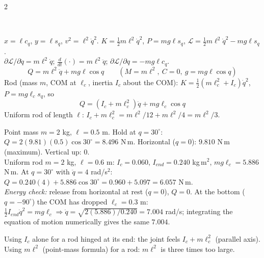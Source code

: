 \begin{multicols}{2}
\begin{center}
\\
\end{center}
\begin{deriv}
$x=\ell c_q$, $y=\ell s_q$, $v^2=\ell^2\dot q^2$. $K=\tfrac12m\ell^2\dot q^2$, $P=mg\ell s_q$, $\mathcal L=\tfrac12m\ell^2\dot q^2-mg\ell s_q$.\\
$\partial\mathcal L/\partial\dot q=m\ell^2\dot q$; $\frac d{dt}(\cdot)=m\ell^2\ddot q$; $\partial\mathcal L/\partial q=-mg\ell c_q$.
\[Q=m\ell^2\ddot q+mg\ell\cos q\qquad(M=m\ell^2,\ C=0,\ g=mg\ell\cos q)\]
Rod (mass $m$, COM at $\ell_c$, inertia $I_c$ about the COM): $K=\tfrac12(m\ell_c^2+I_c)\dot q^2$, $P=mg\ell_cs_q$, so
\[Q=(I_c+m\ell_c^2)\ddot q+mg\ell_c\cos q\]
Uniform rod of length $\ell$: $I_c+m\ell_c^2=m\ell^2/12+m\ell^2/4=m\ell^2/3$.
\end{deriv}
\begin{worked}
Point mass $m=2$ kg, $\ell=0.5$ m. Hold at $q=30^\circ$: $Q=2(9.81)(0.5)\cos30^\circ=8.496$ N\,m. Horizontal ($q=0$): $9.810$ N\,m (maximum). Vertical up: $0$.\\
Uniform rod $m=2$ kg, $\ell=0.6$ m: $I_c=0.060$, $I_{end}=0.240$ kg\,m$^2$, $mg\ell_c=5.886$ N\,m. At $q=30^\circ$ with $\ddot q=4$ rad/s$^2$: $Q=0.240(4)+5.886\cos30^\circ=0.960+5.097=6.057$ N\,m.\\
\emph{Energy check:} release from horizontal at rest ($q=0$), $Q=0$. At the bottom ($q=-90^\circ$) the COM has dropped $\ell_c=0.3$ m: $\tfrac12I_{end}\dot q^2=mg\ell_c\Rightarrow\dot q=\sqrt{2(5.886)/0.240}=7.004$ rad/s; integrating the equation of motion numerically gives the same $7.004$. \chk
\end{worked}
\begin{trap}
Using $I_c$ alone for a rod hinged at its end: the joint feels $I_c+m\ell_c^2$ (parallel axis). Using $m\ell^2$ (point-mass formula) for a rod: $m\ell^2$ is three times too large.
\end{trap}


\end{multicols}
